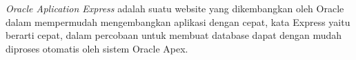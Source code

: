 \textit{Oracle Aplication Express} adalah suatu website yang dikembangkan oleh Oracle dalam mempermudah mengembangkan aplikasi dengan cepat, kata Express yaitu berarti cepat, dalam percobaan untuk membuat database dapat dengan mudah diproses otomatis oleh sistem Oracle Apex.
